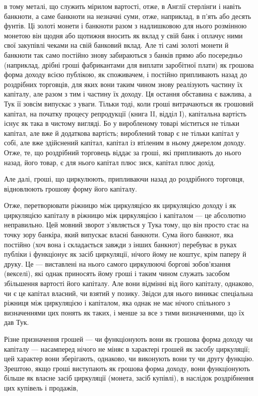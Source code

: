 в тому металі, що служить мірилом вартості, отже, в Англії
стерлінги і навіть банкноти, а саме банкноти на незначні суми,
отже, наприклад, в п’ять або десять фунтів. Ці золоті монети
і банкноти разом з надлишковою для нього розмінною монетою він щодня або щотижня вносить як вклад у
свій банк
і оплачує ними свої закупівлі чеками на свій банковий вклад.
Але ті самі золоті монети й банкноти так само постійно знову
забираються з банків прямо або посередньо (наприклад, дрібні
гроші фабрикантами для виплати заробітної плати) як грошова
форма доходу всією публікою, як споживачем, і постійно припливають назад до роздрібних торговців,
для яких вони таким чином знову реалізують частину їх капіталу, але разом
з тим і частину їх доходу. Ця остання обставина є важлива,
а Тук її зовсім випускає з уваги. Тільки тоді, коли гроші
витрачаються як грошовий капітал,  на початку процесу репродукції (книга II, відділ І), капітальна
вартість існує як така в
чистому вигляді. Бо у виробленому товарі міститься не тільки
капітал, але вже й додаткова вартість; вироблений товар є не
тільки капітал у собі, але вже здійснений капітал, капітал із
втіленим в ньому джерелом доходу. Отже, те, що роздрібний
торговець віддає за гроші, які припливають до нього назад,
його товар, є для нього капітал плюс зиск, капітал плюс дохід.

Але далі, гроші, що циркулюють, припливаючи назад до
роздрібного торговця, відновлюють грошову форму його капіталу.

Отже, перетворювати ріжницю між циркуляцією як циркуляцією доходу і як циркуляцією капіталу в
ріжницю між циркуляцією і капіталом — це абсолютно неправильно. Цей мовний
зворот з’являється у Тука тому, що він просто стає на точку
зору банкіра, який випускає власні банкноти. Сума його банкнот, яка постійно (хоч вона і складається
завжди з інших банкнот) перебуває в руках публіки і функціонує як засіб циркуляції, нічого йому не
коштує, крім паперу й друку. Це —
виставлені на нього самого циркулюючі боргові зобов’язання
(векселі), які однак приносять йому гроші і таким чином служать засобом збільшення вартості його
капіталу. Але вони відмінні від його капіталу, однаково, чи є це капітал власний, чи
взятий у позику. Звідси для нього виникає спеціальна ріжниця
між циркуляцією і капіталом, яка однак не має нічого спільного
з визначеннями цих понять як таких, і менше за все з тими
визначеннями, що їх дав Тук.

Різне призначення грошей — чи функціонують вони як грошова форма доходу чи капіталу — насамперед
нічого не міняє
в характері грошей як засобу циркуляції; цей характер вони
зберігають, однаково, чи виконують вони ту чи другу функцію.
Зрештою, якщо гроші виступають як грошова форма доходу,
вони функціонують більше як власне засіб циркуляції (монета,
засіб купівлі), в наслідок роздрібнення цих купівель і продажів,

